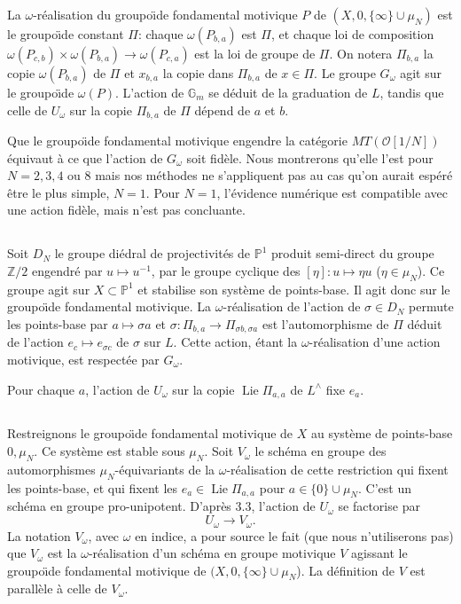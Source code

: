 \documentclass[11pt,a4paper]{article}
\theoremstyle{plain}
\theoremstyle{definition}
\DeclareMathOperator{\Lie}{Lie}
\newcommand{\Di}{D}
\newcommand{\Gm}{\mathbb{G}_m}
\newcommand{\Z}{\mathbb{Z}}
\newcommand{\Pone}{\mathbb{P}^1}
\begin{document}
La $\omega$-r\'ealisation du groupo\"{\i}de fondamental motivique $P$ de $(X, 0, \{\infty\} \cup \mu_N)$ est le groupo\"{\i}de constant $\Pi$: chaque $\omega(P_{b,a})$ est $\Pi$, et chaque loi de composition $\omega(P_{c,b}) \times \omega(P_{b,a}) \to \omega(P_{c,a})$ est la loi de groupe de $\Pi$. On notera $\Pi_{b,a}$ la copie $\omega(P_{b,a})$ de $\Pi$ et $x_{b,a}$ la copie dans $\Pi_{b,a}$ de $x \in \Pi$. Le groupe $G_\omega$ agit sur le groupo\"{\i}de $\omega(P)$. L'action de $\Gm$ se d\'eduit de la graduation de $L$, tandis que celle de $U_\omega$ sur la copie $\Pi_{b,a}$ de $\Pi$ d\'epend de $a$ et $b$.

Que le groupo\"{\i}de fondamental motivique engendre la cat\'egorie $MT(\mathcal{O}[1/N])$ \'equivaut \`a ce que l'action de $G_\omega$ soit fid\`ele. Nous montrerons qu'elle l'est pour $N=2,3,4$ ou $8$ mais nos m\'ethodes ne s'appliquent pas au cas qu'on aurait esp\'er\'e \^etre le plus simple, $N=1$. Pour $N=1$, l'\'evidence num\'erique est compatible avec une action fid\`ele, mais n'est pas concluante.

\subsection{}
Soit $\Di_N$ le groupe di\'edral de projectivit\'es de $\Pone$ produit semi-direct du groupe $\Z/2$ engendr\'e par $u \mapsto u^{-1}$, par le groupe cyclique des $[\eta]: u \mapsto \eta u$ ($\eta \in \mu_N$). Ce groupe agit sur $X \subset \Pone$ et stabilise son syst\`eme de points-base. Il agit donc sur le groupo\"{\i}de fondamental motivique. La $\omega$-r\'ealisation de l'action de $\sigma \in \Di_N$ permute les points-base par $a \mapsto \sigma a$ et $\sigma: \Pi_{b,a} \to \Pi_{\sigma b, \sigma a}$ est l'automorphisme de $\Pi$ d\'eduit de l'action $e_c \mapsto e_{\sigma c}$ de $\sigma$ sur $L$. Cette action, \'etant la $\omega$-r\'ealisation d'une action motivique, est respect\'ee par $G_\omega$.

Pour chaque $a$, l'action de $U_\omega$ sur la copie $\Lie \Pi_{a,a}$ de $L^{\wedge}$ fixe $e_a$.

\subsection{}
Restreignons le groupo\"{\i}de fondamental motivique de $X$ au syst\`eme de points-base $0, \mu_N$. Ce syst\`eme est stable sous $\mu_N$. Soit $V_\omega$ le sch\'ema en groupe des automorphismes $\mu_N$-\'equivariants de la $\omega$-r\'ealisation de cette restriction qui fixent les points-base, et qui fixent les $e_a \in \Lie \Pi_{a,a}$ pour $a \in \{0\} \cup \mu_N$. C'est un sch\'ema en groupe pro-unipotent. D'apr\`es 3.3, l'action de $U_\omega$ se factorise par
\begin{equation}\label{eq:3.4.1}
U_\omega \to V_\omega.
\end{equation}
La notation $V_\omega$, avec $\omega$ en indice, a pour source le fait (que nous n'utiliserons pas) que $V_\omega$ est la $\omega$-r\'ealisation d'un sch\'ema en groupe motivique $V$ agissant le groupo\"{\i}de fondamental motivique de $(X, 0, \{\infty\} \cup \mu_N$). La d\'efinition de $V$ est parall\`ele \`a celle de $V_\omega$.
\end{document}

